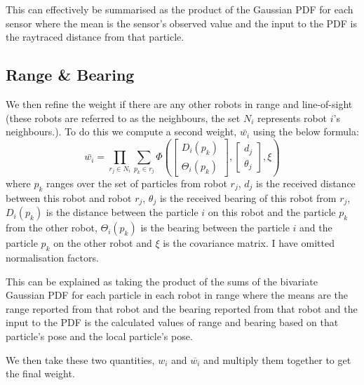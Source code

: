 \documentclass[10pt,a4paper]{article}
\begin{document}
This can effectively be summarised as the product of the Gaussian PDF for each sensor where the mean is the sensor's observed value and the input to the PDF is the raytraced distance from that particle.
\subsection{Range \& Bearing}
We then refine the weight if there are any other robots in range and line-of-sight (these robots are referred to as the neighbours, the set $N_i$ represents robot $i$'s neighbours.). To do this we compute a second weight, $\bar{w_i}$ using the below formula:
\[
	\bar{w_i} = \prod_{r_j \in N_i}\sum_{p_k \in r_j}\Phi\left(
	\begin{bmatrix}
		D_i(p_k)\\
		\Theta_i(p_k)
	\end{bmatrix},
	\begin{bmatrix}
		d_j\\
		\theta_j
	\end{bmatrix},
	\xi
	\right)
\]
where $p_k$ ranges over the set of particles from robot $r_j$, $d_j$ is the received distance between this robot and robot $r_j$, $\theta_j$ is the received bearing of this robot from $r_j$, $D_i(p_k)$ is the distance between the particle $i$ on this robot and the particle $p_k$ from the other robot, $\Theta_i(p_k)$ is the bearing between the particle $i$ and the particle $p_k$ on the other robot and $\xi$ is the covariance matrix. I have omitted normalisation factors.

This can be explained as taking the product of the sums of the bivariate Gaussian PDF for each particle in each robot in range where the means are the range reported from that robot and the bearing reported from that robot and the input to the PDF is the calculated values of range and bearing based on that particle's pose and the local particle's pose.

We then take these two quantities, $w_i$ and $\bar{w_i}$ and multiply them together to get the final weight.
\end{document}
